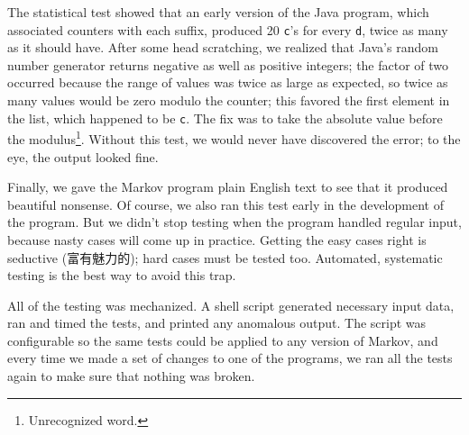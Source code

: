 The statistical test showed that an early version of the Java program,
which associated counters with each suffix, produced 20 \texttt{c}'s for
every \texttt{d}, twice as many as it should have. After some head
scratching, we realized that Java's random number generator returns
negative as well as positive integers; the factor of two occurred because
the range of values was twice as large as expected, so twice as many values
would be zero modulo the counter; this favored the first element in the
list, which happened to be \verb'c'.  The fix was to take the absolute
value before the modulus\footnote{Unrecognized word.}. Without this test,
we would never have discovered the error; to the eye, the output looked
fine.

Finally, we gave the Markov program plain English text to see that it
produced beautiful nonsense. Of course, we also ran this test early in the
development of the program. But we didn't stop testing when the program
handled regular input, because nasty cases will come up in practice.
Getting the easy cases right is seductive (富有魅力的); hard cases must be
tested too. Automated, systematic testing is the best way to avoid this
trap.

All of the testing was mechanized. A shell script generated necessary input
data, ran and timed the tests, and printed any anomalous output. The script
was configurable so the same tests could be applied to any version of
Markov, and every time we made a set of changes to one of the programs, we
ran all the tests again to make sure that nothing was broken.
